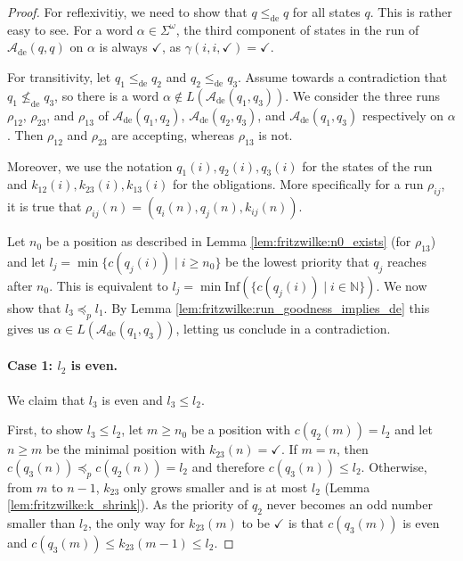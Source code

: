 \begin{proof}
	For reflexivitiy, we need to show that $q \leq_\text{de} q$ for all states $q$. This is rather easy to see. For a word $\alpha \in \Sigma^\omega$, the third component of states in the run of $\mathcal{A}_\text{de}(q, q)$ on $\alpha$ is always $\checkmark$, as $\gamma(i, i, \checkmark) = \checkmark$.
	
	For transitivity, let $q_1 \leq_\text{de} q_2$ and $q_2 \leq_\text{de} q_3$. Assume towards a contradiction that $q_1 \not\leq_\text{de} q_3$, so there is a word $\alpha \notin L(\mathcal{A}_\text{de}(q_1, q_3))$. We consider the three runs $\rho_{12}$, $\rho_{23}$, and $\rho_{13}$ of $\mathcal{A}_\text{de}(q_1, q_2)$, $\mathcal{A}_\text{de}(q_2, q_3)$, and $\mathcal{A}_\text{de}(q_1, q_3)$ respectively on $\alpha$. Then $\rho_{12}$ and $\rho_{23}$ are accepting, whereas $\rho_{13}$ is not. 
	
	Moreover, we use the notation $q_1(i), q_2(i), q_3(i)$ for the states of the run and $k_{12}(i), k_{23}(i), k_{13}(i)$ for the obligations. More specifically for a run $\rho_{ij}$, it is true that $\rho_{ij}(n) = (q_i(n), q_j(n), k_{ij}(n))$.
	
	Let $n_0$ be a position as described in Lemma \ref{lem:fritzwilke:n0_exists} (for $\rho_{13}$) and let $l_j = \min \{ c(q_j(i)) \mid i \geq n_0 \}$ be the lowest priority that $q_j$ reaches after $n_0$.	This is equivalent to $l_j = \min \text{Inf}(\{ c(q_j(i)) \mid i \in \mathbb{N}\})$. We now show that $l_3 \preceq_p l_1$. By Lemma \ref{lem:fritzwilke:run_goodness_implies_de} this gives us $\alpha \in L(\mathcal{A}_\text{de}(q_1, q_3))$, letting us conclude in a contradiction.
	
	\paragraph{Case 1: $l_2$ is even.} We claim that $l_3$ is even and $l_3 \leq l_2$. 
	
	First, to show $l_3 \leq l_2$, let $m \geq n_0$ be a position with $c(q_2(m)) = l_2$ and let $n \geq m$ be the minimal position with $k_{23}(n) = \checkmark$. If $m = n$, then $c(q_3(n)) \preceq_p c(q_2(n)) = l_2$ and therefore $c(q_3(n)) \leq l_2$. Otherwise, from $m$ to $n-1$, $k_{23}$ only grows smaller and is at most $l_2$ (Lemma \ref{lem:fritzwilke:k_shrink}). As the priority of $q_2$ never becomes an odd number smaller than $l_2$, the only way for $k_{23}(m)$ to be $\checkmark$ is that $c(q_3(m))$ is even and $c(q_3(m)) \leq k_{23}(m-1) \leq l_2$.
	

\end{proof}
